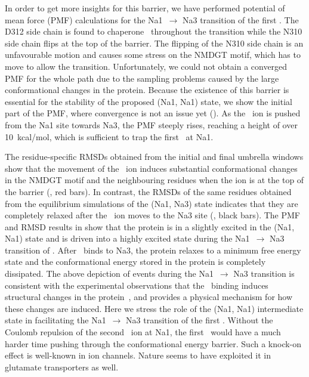 In order to get more insights for this barrier, we have performed potential of mean force (PMF)
calculations for the Na1\prim\ $\rightarrow$ Na3 transition of the first \Na. The D312 side chain is 
found to chaperone \Na\ throughout the transition while the N310 side chain flips at the top of the 
barrier. The flipping of the N310 side chain is an unfavourable motion and causes some stress on the 
NMDGT motif, which has to move to allow the transition. Unfortunately, we could not obtain a converged 
PMF for the whole path due to the sampling problems caused by the large conformational changes in the 
protein. Because the existence of this barrier is essential for the stability of the proposed (Na1, 
Na1\prim) state, we show the initial part of the PMF, where convergence is not an issue yet 
(). As the \Na\ ion is pushed from the Na1 site towards Na3, the PMF steeply rises, 
reaching a height of over 10~kcal/mol, which is sufficient to trap the first \Na\ at Na1\prim.

The residue-specific RMSDs obtained from the initial and final umbrella windows show that the movement 
of the \Na\ ion induces substantial conformational changes in the NMDGT motif and the neighbouring 
residues when the ion is at the top of the barrier (, red bars). In contrast, 
the RMSDs of the same residues obtained from the equilibrium simulations of the (Na1, Na3) state indicates 
that they are completely relaxed after the \Na\ ion moves to the Na3 site (, black 
bars). The PMF and RMSD results in  show that the protein is in a slightly excited in 
the (Na1, Na1\prim) state and is driven into a highly excited state during the Na1\prim\ $\rightarrow$ Na3 
transition of \Na. After \Na\ binds to Na3, the protein relaxes to a minimum free energy state and the 
conformational energy stored in the protein is completely dissipated. The above depiction of events during 
the Na1\prim\ $\rightarrow$ Na3 transition is consistent with the experimental observations that the \Na\ 
binding induces structural changes in the protein~\cite{Reyes2013b,Hanelt2015}, and provides a physical 
mechanism for how these changes are induced. Here we stress the role of the (Na1, Na1\prim) intermediate 
state in facilitating the Na1\prim\ $\rightarrow$ Na3 transition of the first \Na. Without the Coulomb 
repulsion of the second \Na\ ion at Na1, the first \Na\ would have a much harder time pushing through 
the conformational energy barrier. Such a knock-on effect is well-known in ion channels. Nature seems 
to have exploited it in glutamate transporters as well. 

